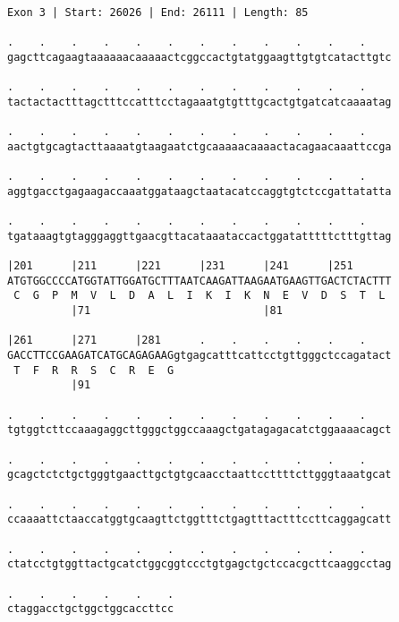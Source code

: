 \documentclass{article}
\begin{document}
\newpage
\begin{Verbatim}
Exon 3 | Start: 26026 | End: 26111 | Length: 85
 
.    .    .    .    .    .    .    .    .    .    .    .    
gagcttcagaagtaaaaaacaaaaactcggccactgtatggaagttgtgtcatacttgtc
  
.    .    .    .    .    .    .    .    .    .    .    .    
tactactactttagctttccatttcctagaaatgtgtttgcactgtgatcatcaaaatag
  
.    .    .    .    .    .    .    .    .    .    .    .    
aactgtgcagtacttaaaatgtaagaatctgcaaaaacaaaactacagaacaaattccga
  
.    .    .    .    .    .    .    .    .    .    .    .    
aggtgacctgagaagaccaaatggataagctaatacatccaggtgtctccgattatatta
  
.    .    .    .    .    .    .    .    .    .    .    .    
tgataaagtgtagggaggttgaacgttacataaataccactggatatttttctttgttag
  
|201      |211      |221      |231      |241      |251      
ATGTGGCCCCATGGTATTGGATGCTTTAATCAAGATTAAGAATGAAGTTGACTCTACTTT
 C  G  P  M  V  L  D  A  L  I  K  I  K  N  E  V  D  S  T  L 
          |71                           |81                 
  
|261      |271      |281      .    .    .    .    .    .    
GACCTTCCGAAGATCATGCAGAGAAGgtgagcatttcattcctgttgggctccagatact
 T  F  R  R  S  C  R  E  G                                  
          |91                                               
  
.    .    .    .    .    .    .    .    .    .    .    .    
tgtggtcttccaaagaggcttgggctggccaaagctgatagagacatctggaaaacagct
  
.    .    .    .    .    .    .    .    .    .    .    .    
gcagctctctgctgggtgaacttgctgtgcaacctaattccttttcttgggtaaatgcat
  
.    .    .    .    .    .    .    .    .    .    .    .    
ccaaaattctaaccatggtgcaagttctggtttctgagtttactttccttcaggagcatt
  
.    .    .    .    .    .    .    .    .    .    .    .    
ctatcctgtggttactgcatctggcggtccctgtgagctgctccacgcttcaaggcctag
  
.    .    .    .    .    .
ctaggacctgctggctggcaccttcc
\end{Verbatim}
\newpage
\end{document}
